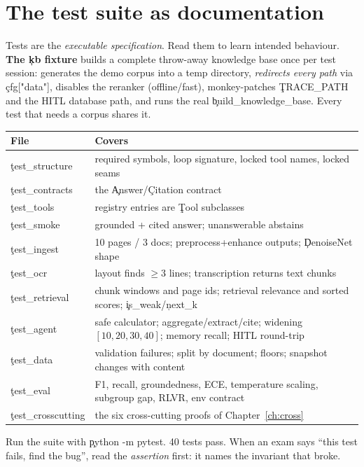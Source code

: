 \section{The test suite as documentation}
Tests are the \emph{executable specification}. Read them to learn intended behaviour.
\textbf{The \c{kb} fixture} builds a complete throw-away knowledge base once per test session: generates the demo corpus into a temp directory, \emph{redirects every path} via \c{cfg["data"]}, disables the reranker (offline/fast), monkey-patches \c{TRACE\_PATH} and the HITL database path, and runs the real \c{build\_knowledge\_base}. Every test that needs a corpus shares it.
\begin{center}\small\begin{tabular}{@{}p{3.1cm}p{11.4cm}@{}}\toprule File & Covers \\ \midrule
\c{test\_structure} & required symbols, loop signature, locked tool names, locked seams \\
\c{test\_contracts} & the \c{Answer}/\c{Citation} contract \\
\c{test\_tools} & registry entries are \c{Tool} subclasses \\
\c{test\_smoke} & grounded + cited answer; unanswerable abstains \\
\c{test\_ingest} & 10 pages / 3 docs; preprocess+enhance outputs; \c{DenoiseNet} shape \\
\c{test\_ocr} & layout finds $\ge3$ lines; transcription returns text chunks \\
\c{test\_retrieval} & chunk windows and page ids; retrieval relevance and sorted scores; \c{is\_weak}/\c{next\_k} \\
\c{test\_agent} & safe calculator; aggregate/extract/cite; widening $[10,20,30,40]$; memory recall; HITL round-trip \\
\c{test\_data} & validation failures; split by document; floors; snapshot changes with content \\
\c{test\_eval} & F1, recall, groundedness, ECE, temperature scaling, subgroup gap, RLVR, env contract \\
\c{test\_crosscutting} & the six cross-cutting proofs of Chapter~\ref{ch:cross} \\
\bottomrule\end{tabular}\end{center}
\begin{tip}Run the suite with \c{python -m pytest}. 40 tests pass. When an exam says ``this test fails, find the bug'', read the \emph{assertion} first: it names the invariant that broke.\end{tip}
